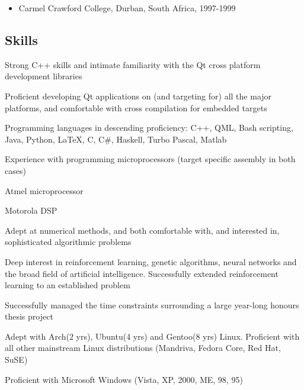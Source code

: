 \documentclass{article}
\begin{document}
\begin{itemize}
\item{	Carmel Crawford College, Durban, South Africa, 1997-1999}
\end{itemize}

\subsection*{Skills}
\begin{itemize*}
\item{ Strong C++ skills and intimate familiarity with the Qt cross platform development libraries}
\item{ Proficient developing Qt applications on (and targeting for) all the major platforms, and comfortable with cross compilation for embedded targets }
\item{ Programming languages in descending proficiency: C++, QML, Bash scripting, Java, Python, \LaTeX, C, C\#, Haskell, Turbo Pascal, Matlab}
\item{ Experience with programming microprocessors (target specific assembly in both cases) }
\begin{itemize*}
\item{ Atmel microprocessor}
\item{ Motorola DSP}
\end{itemize*}
\item{ Adept at numerical methods, and both comfortable with, and interested in, sophisticated algorithmic problems}
\item{ Deep interest in reinforcement learning, genetic algorithms, neural networks and the broad field of artificial intelligence. Successfully extended reinforcement learning to an established problem}
\item{ Successfully managed the time constraints surrounding a large year-long honours thesis project}
\item{ Adept with Arch(2 yrs), Ubuntu(4 yrs) and Gentoo(8 yrs) Linux. Proficient with all other mainstream Linux distributions (Mandriva, Fedora Core, Red Hat, SuSE)}
\item{ Proficient with Microsoft Windows (Vista, XP, 2000, ME, 98, 95)}
\end{itemize*}
\end{document}

